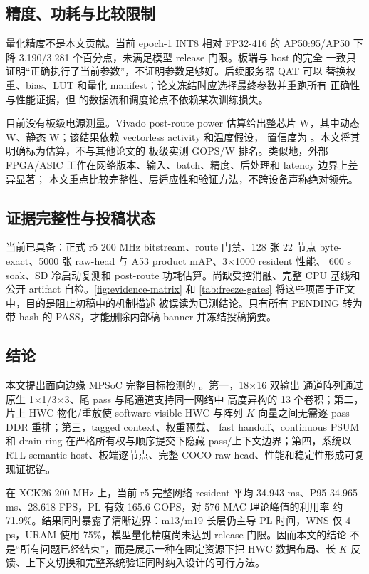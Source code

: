 \subsection{精度、功耗与比较限制}

量化精度不是本文贡献。当前 epoch-1 INT8 相对 FP32-416 的 AP50:95/AP50
下降 3.190/3.281 个百分点，未满足模型 release 门限。板端与 host 的完全
一致只证明“正确执行了当前参数”，不证明参数足够好。后续服务器 QAT 可以
替换权重、bias、LUT 和量化 manifest；论文冻结时应选择最终参数并重跑所有
正确性与性能证据，但 \LASA 的数据流和调度论点不依赖某次训练损失。

目前没有板级电源测量。Vivado post-route power 估算给出整芯片
\PostRoutePowerTotalW{} W，其中动态 \PostRoutePowerDynamicW{} W、静态
\PostRoutePowerStaticW{} W；该结果依赖 vectorless activity 和温度假设，
置信度为 \PostRoutePowerConfidence{}。本文将其明确标为估算，不与其他论文的
板级实测 GOPS/W 排名。类似地，外部 FPGA/ASIC
工作在网络版本、输入、batch、精度、后处理和 latency 边界上差异显著；
本文重点比较完整性、层适应性和验证方法，不跨设备声称绝对领先。

\subsection{证据完整性与投稿状态}

当前已具备：正式 r5 200 MHz bitstream、route 门禁、128 张 22 节点
byte-exact、5000 张 raw-head 与 A53 product mAP、3$\times$1000 resident 性能、
600 s soak、SD 冷启动复测和 post-route 功耗估算。尚缺受控消融、完整 CPU
基线和公开 artifact 自检。\cref{fig:evidence-matrix}
和 \cref{tab:freeze-gates} 将这些项置于正文中，目的是阻止初稿中的机制描述
被误读为已测结论。只有所有 PENDING 转为带 hash 的 PASS，才能删除内部稿
banner 并冻结投稿摘要。

\subsection{结论}

本文提出面向边缘 MPSoC 完整目标检测的 \LASA。第一，18$\times$16 双输出
通道阵列通过原生 1$\times$1/3$\times$3、尾 pass 与尾通道支持同一网络中
高度异构的 13 个卷积；第二，片上 HWC 物化/重放使 software-visible HWC
与阵列 $K$ 向量之间无需逐 pass DDR 重排；第三，tagged context、权重预载、
fast handoff、continuous PSUM 和 drain ring 在严格所有权与顺序提交下隐藏
pass/上下文边界；第四，系统以 RTL-semantic host、板端逐节点、完整 COCO
raw head、性能和稳定性形成可复现证据链。

在 XCK26 200 MHz 上，当前 r5 完整网络 resident 平均 34.943 ms、P95
34.965 ms、28.618 FPS，PL 有效 165.6 GOPS，对 576-MAC 理论峰值的利用率
约 71.9\%。结果同时暴露了清晰边界：m13/m19 长层仍主导 PL 时间，WNS 仅
4 ps，URAM 使用 75\%，模型量化精度尚未达到 release 门限。因而本文的结论
不是“所有问题已经结束”，而是展示一种在固定资源下把 HWC 数据布局、长
$K$ 反馈、上下文切换和完整系统验证同时纳入设计的可行方法。
